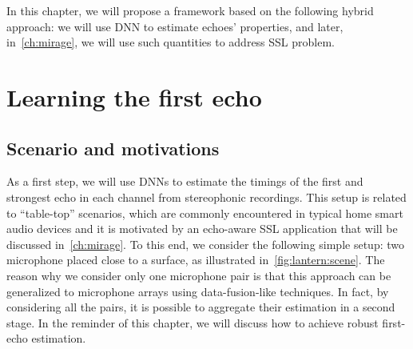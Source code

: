 
\mynewline
In this chapter, we will propose a framework based on the following hybrid approach:
we will use \ac{DNN} to estimate echoes' properties, and later, in~\cref{ch:mirage}, we will use such quantities to address \ac{SSL} problem.

\section{Learning the first echo}\label{sec:lantern:simple}

\subsection{Scenario and motivations}
As a first step, we will use \acp{DNN} to estimate the timings of the first and strongest echo in each channel from stereophonic recordings.
This setup is related to ``table-top'' scenarios, which are commonly encountered in typical home smart audio devices and it is motivated by an echo-aware \acf{SSL} application that will be discussed in~\cref{ch:mirage}.
To this end, we consider the following simple setup: two microphone placed close to a surface, as illustrated in~\cref{fig:lantern:scene}.
The reason why we consider only one microphone pair is that this approach can be generalized to microphone arrays using data-fusion-like techniques.
In fact, by considering all the pairs, it is possible to aggregate their estimation in a second stage.
In the reminder of this chapter, we will discuss how to achieve robust first-echo estimation.

